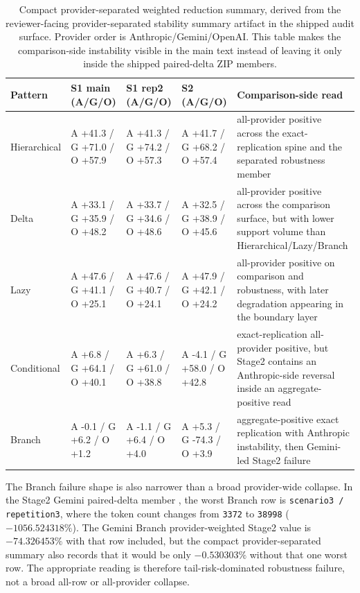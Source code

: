 \documentclass[11pt,a4paper]{article}
\begin{document}
\begin{table}[t]
\centering
\small
\begin{tabular}{L{1.6cm}L{2.7cm}L{2.7cm}L{2.7cm}L{4.0cm}}
\toprule
\textbf{Pattern} & \textbf{S1 main (A/G/O)} & \textbf{S1 rep2 (A/G/O)} & \textbf{S2 (A/G/O)} & \textbf{Comparison-side read} \\
\midrule
Hierarchical & A +41.3 / G +71.0 / O +57.9 & A +41.3 / G +74.2 / O +57.3 & A +41.7 / G +68.2 / O +57.4 & all-provider positive across the exact-replication spine and the separated robustness member \\
Delta & A +33.1 / G +35.9 / O +48.2 & A +33.7 / G +34.6 / O +48.6 & A +32.5 / G +38.9 / O +45.6 & all-provider positive across the comparison surface, but with lower support volume than Hierarchical/Lazy/Branch \\
Lazy & A +47.6 / G +41.1 / O +25.1 & A +47.6 / G +40.7 / O +24.1 & A +47.9 / G +42.1 / O +24.2 & all-provider positive on comparison and robustness, with later degradation appearing in the boundary layer \\
Conditional & A +6.8 / G +64.1 / O +40.1 & A +6.3 / G +61.0 / O +38.8 & A -4.1 / G +58.0 / O +42.8 & exact-replication all-provider positive, but Stage2 contains an Anthropic-side reversal inside an aggregate-positive read \\
Branch & A -0.1 / G +6.2 / O +1.2 & A -1.1 / G +6.4 / O +4.0 & A +5.3 / G -74.3 / O +3.9 & aggregate-positive exact replication with Anthropic instability, then Gemini-led Stage2 failure \\
\bottomrule
\end{tabular}
\caption{Compact provider-separated weighted reduction summary, derived from the reviewer-facing provider-separated stability summary artifact in the shipped audit surface. Provider order is Anthropic/Gemini/OpenAI. This table makes the comparison-side instability visible in the main text instead of leaving it only inside the shipped paired-delta ZIP members.}
\label{tab:provider_separated_stability}
\end{table}

The Branch failure shape is also narrower than a broad provider-wide collapse. In the Stage2 Gemini paired-delta member , the worst Branch row is \texttt{scenario3 / repetition3}, where the token count changes from \texttt{3372} to \texttt{38998} (\(-1056.524318\%\)). The Gemini Branch provider-weighted Stage2 value is \(-74.326453\%\) with that row included, but the compact provider-separated summary also records that it would be only \(-0.530303\%\) without that one worst row. The appropriate reading is therefore tail-risk-dominated robustness failure, not a broad all-row or all-provider collapse.
\end{document}

